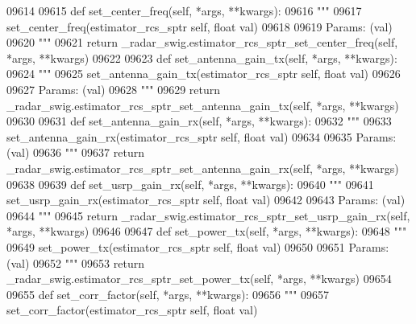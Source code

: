 \begin{DoxyCode}
{{{{{{{{{{{{{{{{{{{{{{{{{{{{{{{09614 
09615     \textcolor{keyword}{def }set_center_freq(self, *args, **kwargs):
09616         \textcolor{stringliteral}{"""}
09617 \textcolor{stringliteral}{        set\_center\_freq(estimator\_rcs\_sptr self, float val)}
09618 \textcolor{stringliteral}{}
09619 \textcolor{stringliteral}{        Params: (val)}
09620 \textcolor{stringliteral}{        """}
09621         \textcolor{keywordflow}{return} \_radar\_swig.estimator\_rcs\_sptr\_set\_center\_freq(self, *args, **kwargs)
09622 
09623     \textcolor{keyword}{def }set_antenna_gain_tx(self, *args, **kwargs):
09624         \textcolor{stringliteral}{"""}
09625 \textcolor{stringliteral}{        set\_antenna\_gain\_tx(estimator\_rcs\_sptr self, float val)}
09626 \textcolor{stringliteral}{}
09627 \textcolor{stringliteral}{        Params: (val)}
09628 \textcolor{stringliteral}{        """}
09629         \textcolor{keywordflow}{return} \_radar\_swig.estimator\_rcs\_sptr\_set\_antenna\_gain\_tx(self, *args, **kwargs)
09630 
09631     \textcolor{keyword}{def }set_antenna_gain_rx(self, *args, **kwargs):
09632         \textcolor{stringliteral}{"""}
09633 \textcolor{stringliteral}{        set\_antenna\_gain\_rx(estimator\_rcs\_sptr self, float val)}
09634 \textcolor{stringliteral}{}
09635 \textcolor{stringliteral}{        Params: (val)}
09636 \textcolor{stringliteral}{        """}
09637         \textcolor{keywordflow}{return} \_radar\_swig.estimator\_rcs\_sptr\_set\_antenna\_gain\_rx(self, *args, **kwargs)
09638 
09639     \textcolor{keyword}{def }set_usrp_gain_rx(self, *args, **kwargs):
09640         \textcolor{stringliteral}{"""}
09641 \textcolor{stringliteral}{        set\_usrp\_gain\_rx(estimator\_rcs\_sptr self, float val)}
09642 \textcolor{stringliteral}{}
09643 \textcolor{stringliteral}{        Params: (val)}
09644 \textcolor{stringliteral}{        """}
09645         \textcolor{keywordflow}{return} \_radar\_swig.estimator\_rcs\_sptr\_set\_usrp\_gain\_rx(self, *args, **kwargs)
09646 
09647     \textcolor{keyword}{def }set_power_tx(self, *args, **kwargs):
09648         \textcolor{stringliteral}{"""}
09649 \textcolor{stringliteral}{        set\_power\_tx(estimator\_rcs\_sptr self, float val)}
09650 \textcolor{stringliteral}{}
09651 \textcolor{stringliteral}{        Params: (val)}
09652 \textcolor{stringliteral}{        """}
09653         \textcolor{keywordflow}{return} \_radar\_swig.estimator\_rcs\_sptr\_set\_power\_tx(self, *args, **kwargs)
09654 
09655     \textcolor{keyword}{def }set_corr_factor(self, *args, **kwargs):
09656         \textcolor{stringliteral}{"""}
09657 \textcolor{stringliteral}{        set\_corr\_factor(estimator\_rcs\_sptr self, float val)}
}}}}}}}}}}}}}}}}}}}}}}}}}}}}}}}
\end{DoxyCode}
